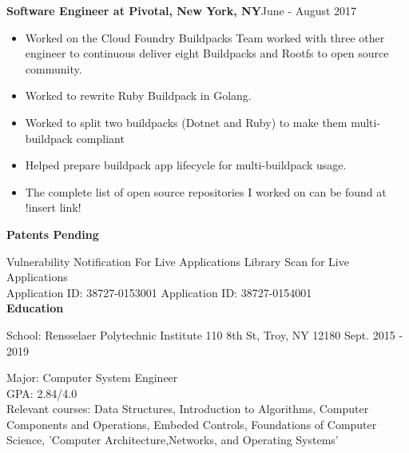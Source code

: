 \documentclass[10pt,a4papaer]{article}
\begin{document}
{	{\noindent\textbf{Software Engineer at Pivotal, New York, NY}}{\hfill June - August 2017}
	\begin{itemize}[noitemsep, topsep=0pt]
		\item Worked on the Cloud Foundry Buildpacks Team worked with three other engineer to continuous deliver eight Buildpacks and Rootfs to open source community. 
		\item Worked to rewrite Ruby Buildpack in Golang.
		\item Worked to split two buildpacks (Dotnet and Ruby) to make them multi-buildpack compliant
		\item Helped prepare buildpack app lifecycle for multi-buildpack usage.
		\item The complete list of open source repositories I worked on can be found at !insert link!\\
		
	\end{itemize}
	
	\setlength{\leftskip}{0pt}
	
	{\noindent\textbf{Patents Pending}\vspace*{-20px}\\}
	
	\noindent\makebox[\linewidth]{\rule{\textwidth}{1pt}}
	
	\setlength{\leftskip}{15pt}
	
	\noindent Vulnerability Notification For Live Applications {\hfill Library Scan for Live Applications}\\
	Application ID: 38727-0153001 {\hfill Application ID: 38727-0154001\quad}\\
	
	\setlength{\leftskip}{0pt}
	{\noindent\textbf{Education}}\vspace*{-20px}\\
	
	\noindent\makebox[\linewidth]{\rule{\textwidth}{1.3pt}}
	
	{ School: Rensselaer Polytechnic Institute 110 8th St, Troy, NY 12180 {\hfill Sept. 2015 - 2019}}
	
	\setlength{\leftskip}{50pt}
	
	{\noindent Major: Computer System Engineer\\
		GPA: 2.84/4.0\\
		Relevant courses: Data Structures, Introduction to Algorithms, Computer Components and Operations, Embeded Controls, Foundations of Computer Science, 'Computer Architecture,Networks, and Operating Systems'}\\
	
}
\end{document}
